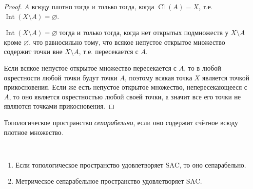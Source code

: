 \documentclass[12pt,a4paper]{article}
\DeclareMathOperator{\Int}{Int}
\DeclareMathOperator{\Cl}{Cl}
\newcommand{\SAC}{\ensuremath{\mathrm{SAC}}\xspace}
\begin{document}
    \begin{proof}
        $A$ всюду плотно тогда и только тогда, когда $\Cl(A) = X$, т.е. $\Int(X \setminus A) = \varnothing$.

        $\Int(X \setminus A) = \varnothing$ тогда и только тогда, когда нет открытых подмножеств у $X \setminus A$ кроме $\varnothing$, что равносильно тому, что всякое непустое открытое множество содержит точки вне $X \setminus A$, т.е. пересекается с $A$.

        Если всякое непустое открытое множество пересекается с $A$, то в любой окрестности любой точки будут точки $A$, поэтому всякая точка $X$ является точкой прикосновения. Если же есть непустое открытое множество, непересекающееся с $A$, то оно является окрестностью любой своей точки, а значит все его точки не являются точками прикосновения.
    \end{proof}

    \begin{definition}
        Топологическое пространство \emph{сепарабельно}, если оно содержит счётное всюду плотное множество.
    \end{definition}

    \begin{theorem}\label{separable_space_properties}\ 
        \begin{enumerate}
            \item Если топологическое пространство удовлетворяет \SAC, то оно сепарабельно.
            \item Метрическое сепарабельное пространство удовлетворяет \SAC.
        \end{enumerate}
    \end{theorem}
\end{document}
